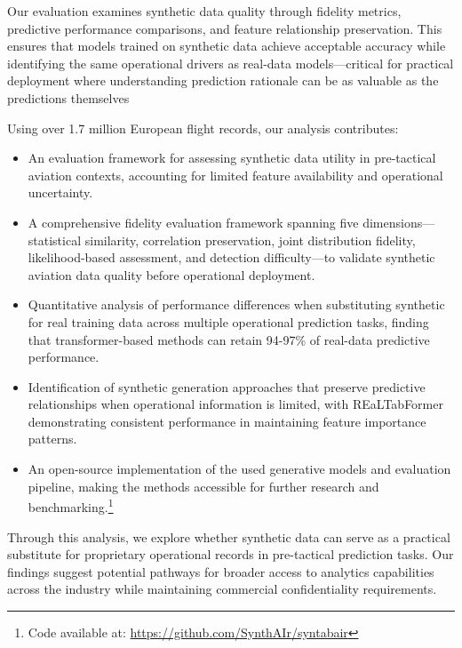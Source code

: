\documentclass[conference]{IEEEtran}
\begin{document}
Our evaluation examines synthetic data quality through fidelity metrics, predictive performance comparisons, and feature relationship preservation. This ensures that models trained on synthetic data achieve acceptable accuracy while identifying the same operational drivers as real-data models—critical for practical deployment where understanding prediction rationale can be as valuable as the predictions themselves


Using over 1.7 million European flight records, our analysis contributes:
\begin{itemize}
\item An evaluation framework for assessing synthetic data utility in pre-tactical aviation contexts, accounting for limited feature availability and operational uncertainty.
\item A comprehensive fidelity evaluation framework spanning five dimensions—statistical similarity, correlation preservation, joint distribution fidelity, likelihood-based assessment, and detection difficulty—to validate synthetic aviation data quality before operational deployment.
\item Quantitative analysis of performance differences when substituting synthetic for real training data across multiple operational prediction tasks, finding that transformer-based methods can retain 94-97\% of real-data predictive performance.
\item Identification of synthetic generation approaches that preserve predictive relationships when operational information is limited, with REaLTabFormer demonstrating consistent performance in maintaining feature importance patterns.
\item An open-source implementation of the used generative models and evaluation pipeline, making the methods accessible for further research and benchmarking.\footnote{Code available at: \href{https://github.com/SynthAIr/syntabair}{https://github.com/SynthAIr/syntabair}}
\end{itemize}


Through this analysis, we explore whether synthetic data can serve as a practical substitute for proprietary operational records in pre-tactical prediction tasks. Our findings suggest potential pathways for broader access to analytics capabilities across the industry while maintaining commercial confidentiality requirements.
\end{document}
